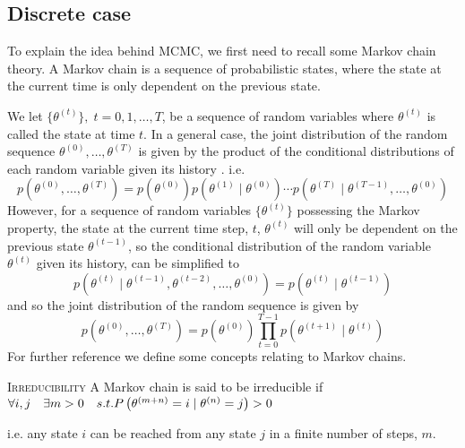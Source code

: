 \subsection{Discrete case}\label{subsec:markov_discrete}
To explain the idea behind MCMC, we first need to recall some Markov chain theory. 
A Markov chain is a sequence of probabilistic states, where the state at the current time is only dependent on the previous state. 
\par
We let $\{\theta^{\left(t\right)}\}, \; t = 0, 1, \ldots, T$,  be a sequence of random variables where $\theta^{\left(t\right)}$ is called the state at time $t$. In a general case, the joint distribution of the random sequence $\theta^{(0)}, \ldots, \theta^{(T)}$ is given by the product of the conditional distributions of each random variable given its history \cite{CS}.  i.e. 
\begin{equation*}
    p\left(\theta^{(0)}, \ldots, \theta^{(T)}\right) = p\left(\theta^{(0)}\right) p\left(\theta^{(1)}\mid \theta^{(0)}\right)  \cdots  p\left(\theta^{(T)}\mid \theta^{(T-1 )},\ldots, \theta^{(0)}\right)
\end{equation*}
However, for a sequence of random variables $\{\theta^{(t)}\}$ possessing the Markov property, the state at the current time step,  $t$, $\theta^{(t)}$ will only be dependent on the previous state $\theta^{(t-1)}$, so the conditional distribution of the random variable $\theta^{(t)}$ given its history, can be simplified to
\begin{equation}\label{eq:markov}
    p\left(\theta^{(t)}\mid \theta^{(t-1)}, \theta^{(t-2)}, \ldots, \theta^{(0)}\right) = p\left(\theta^{(t)}\mid \theta^{(t-1)}\right)
\end{equation}
and so the joint distribution of the random sequence is given by 
\begin{equation*}
    p\left(\theta^{(0)}, \ldots, \theta^{(T)}\right) = p\left(\theta^{\left(0\right)}\right)\prod_{t = 0}^{T-1} p\left(\theta^{(t+1)}\mid \theta^{(t)}\right)
\end{equation*}
For further reference we define some concepts relating to Markov chains.
\theoremstyle{definition}
\begin{definition}{\textsc{Irreducibility}} A Markov chain is said to be irreducible if $\forall i, j \quad \exists m > 0 \quad s.t. \\ P\left(\theta^{(m+n)} = i\mid \theta^{(n)} = j \right) > 0$
\end{definition}
i.e. any state $i$ can be reached from any state $j$ in a finite number of steps, $m$.
